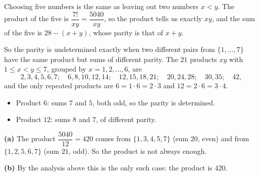 Choosing five numbers is the same as leaving out two numbers $x<y$. The product of the five is $\dfrac{7!}{xy}=\dfrac{5040}{xy}$, so the product tells us exactly $xy$, and the sum of the five is $28-(x+y)$, whose parity is that of $x+y$.

So the parity is undetermined exactly when two different pairs from $\{1,\dots,7\}$ have the same product but sums of different parity. The $21$ products $xy$ with $1\le x<y\le7$, grouped by $x=1,2,\dots,6$, are
\[2,3,4,5,6,7;\quad6,8,10,12,14;\quad12,15,18,21;\quad20,24,28;\quad30,35;\quad42,\]
and the only repeated products are $6=1\cdot6=2\cdot3$ and $12=2\cdot6=3\cdot4$.
\begin{itemize}
\item Product $6$: sums $7$ and $5$, both odd, so the parity is determined.
\item Product $12$: sums $8$ and $7$, of different parity.
\end{itemize}
\textbf{(a)} The product $\dfrac{5040}{12}=420$ comes from $\{1,3,4,5,7\}$ (sum $20$, even) and from $\{1,2,5,6,7\}$ (sum $21$, odd). So the product is not always enough.

\textbf{(b)} By the analysis above this is the only such case: the product is $\boxed{420}$.
